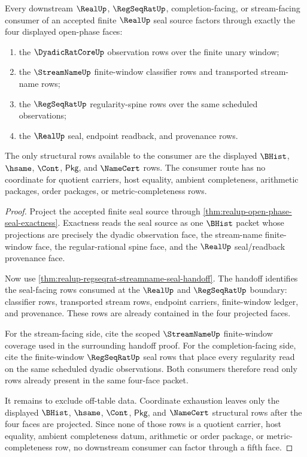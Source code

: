\begin{theorem}
\label{thm:realup-open-phase-four-face-consumer-totality}
Every downstream $\RealUp$, $\RegSeqRatUp$, completion-facing, or
stream-facing consumer of an accepted finite $\RealUp$ seal source factors
through exactly the four displayed open-phase faces:
\begin{enumerate}
  \item the $\DyadicRatCoreUp$ observation rows over the finite unary window;
  \item the $\StreamNameUp$ finite-window classifier rows and transported
  stream-name rows;
  \item the $\RegSeqRatUp$ regularity-spine rows over the same scheduled
  observations;
  \item the $\RealUp$ seal, endpoint readback, and provenance rows.
\end{enumerate}
The only structural rows available to the consumer are the displayed
$\BHist$, $\hsame$, $\Cont$, $\mathsf{Pkg}$, and $\NameCert$ rows. The
consumer route has no coordinate for quotient carriers, host equality, ambient
completeness, arithmetic packages, order packages, or metric-completeness rows.
\end{theorem}
\begin{proof}
Project the accepted finite seal source through
\autoref{thm:realup-open-phase-seal-exactness}. Exactness reads the seal source
as one $\BHist$ packet whose projections are precisely the dyadic observation
face, the stream-name finite-window face, the regular-rational spine face, and
the $\RealUp$ seal/readback provenance face.

Now use \autoref{thm:realup-regseqrat-streamname-seal-handoff}. The handoff
identifies the seal-facing rows consumed at the $\RealUp$ and $\RegSeqRatUp$
boundary: classifier rows, transported stream rows, endpoint carriers,
finite-window ledger, and provenance. These rows are already contained in the
four projected faces.

For the stream-facing side, cite the scoped $\StreamNameUp$ finite-window
coverage used in the surrounding handoff proof. For the completion-facing side,
cite the finite-window $\RegSeqRatUp$ seal rows that place every regularity
read on the same scheduled dyadic observations. Both consumers therefore read
only rows already present in the same four-face packet.

It remains to exclude off-table data. Coordinate exhaustion leaves only the
displayed $\BHist$, $\hsame$, $\Cont$, $\mathsf{Pkg}$, and $\NameCert$
structural rows after the four faces are projected. Since none of those rows is
a quotient carrier, host equality, ambient completeness datum, arithmetic or
order package, or metric-completeness row, no downstream consumer can factor
through a fifth face.
\end{proof}

